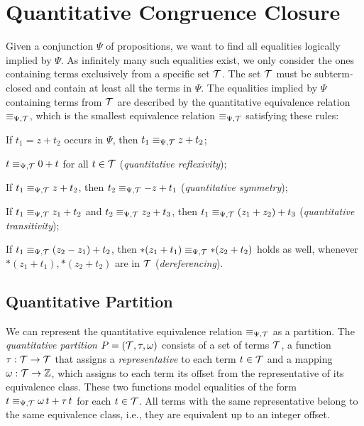 \section{Quantitative Congruence Closure}\label{chapter:qcc}

Given a conjunction $\Psi$ of propositions, we want to find all equalities logically implied by $\Psi$.
As infinitely many such equalities exist, we only consider the ones containing terms exclusively from a specific set $\mathcal{T}$.
The set $\mathcal{T}$ must be subterm-closed and contain at least all the terms in $\Psi$.
The equalities implied by $\Psi$ containing terms from $\mathcal{T}$ are described by the quantitative equivalence relation $\equiv_{\Psi,\mathcal{T}}$, which is the smallest equivalence relation $\equiv_{\Psi,\mathcal{T}}$ satisfying these rules:
\begin{enumerate}[label={[E\arabic*]}, ref={[E\arabic*]}]
  \setcounter{enumi}{-1}
  \item\label{item:persistence} If $t_1 = z+t_2$ occurs in $\Psi$, then $t_1 \equiv_{\Psi,\mathcal{T}} z+t_2$;
  \item\label{item:quantitative-reflexivity} $t \equiv_{\Psi,\mathcal{T}} 0+t$ for all $t\in\mathcal{T}$ (\emph{quantitative reflexivity});
  \item\label{item:quantitative-symmetry} If $t_1 \equiv_{\Psi,\mathcal{T}} z+t_2$, then $t_2 \equiv_{\Psi,\mathcal{T}} -z+t_1$ (\emph{quantitative symmetry});
  \item\label{item:quantitative-transitivity} If $t_1 \equiv_{\Psi,\mathcal{T}} z_1+t_2$ and $t_2 \equiv_{\Psi,\mathcal{T}} z_2 + t_3$,
        then $t_1 \equiv_{\Psi,\mathcal{T}} (z_1+z_2)+t_3$ (\emph{quantitative transitivity});
  \item\label{item:dereferencing} If $t_1 \equiv_{\Psi,\mathcal{T}} (z_2 - z_1) + t_2$, then $*(z_1 + t_1) \equiv_{\Psi,\mathcal{T}} *(z_2 + t_2)$ holds as well, whenever $*(z_1 + t_1),  *(z_2 + t_2)$ are in $\mathcal{T}$ (\emph{dereferencing}).
\end{enumerate}

\subsection{Quantitative Partition}\label{subsection:quantitative-union-find}

We can represent the quantitative equivalence relation $\equiv_{\Psi,\mathcal{T}}$ as a partition.
The \emph{quantitative partition} $P = (\mathcal{T}, \tau, \omega)$ consists of a set of terms $\mathcal{T}$,
a function $\tau : \mathcal{T} \rightarrow \mathcal{T}$ that assigns a \emph{representative} to each term $t \in \mathcal{T}$ and a mapping $\omega : \mathcal{T} \rightarrow \mathbb{Z}$,
which assigns to each term its offset from the representative of its equivalence class.
These two functions model equalities of the form $t \equiv_{\Psi,\mathcal{T}} \omega\,t + \tau\,t$ for each $t \in \mathcal{T}$.
All terms with the same representative belong to the same equivalence class, i.e., they are equivalent up to an integer offset.


